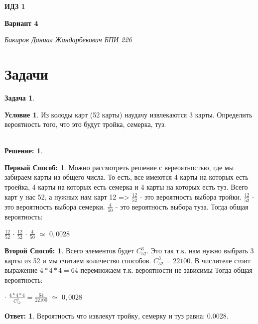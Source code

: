 \documentclass[amstex,11pt,a4paper]{article}
\theoremstyle{definition}
\newtheorem{ex}[problem]{Задача}
\newtheorem{disc}{Условие}
\newtheorem{resh}{Решение:}
\newtheorem{pl}{Первый Способ:}
\newtheorem{pk}{Второй Способ:}
\newtheorem{answer}{Ответ:}
\begin{document}

\centerline{\textbf{ИДЗ 1}}
\centerline{\textbf{Вариант 4}}
\begin{flushright}
\emph{Бакиров Даниал Жандарбекович БПИ 226}
\end{flushright}

\thispagestyle{empty}

\section{Задачи}


\begin{ex}
\begin{disc}
    Из колоды карт (52 карты) наудачу извлекаются 3 карты. Определить
вероятность того, что это будут тройка, семерка, туз.
\\
\\
\begin{resh}
    \begin{pl}
        Можно рассмотреть решение с вереоятностью, где мы забираем карты из общего числа. То есть, все имеются 4 карты на которых есть троейка, 4 карты на которых есть семерка и 4 карты на которых есть туз. Всего карт у нас 52, а нужных нам карт 12 => $\frac{12}{52} $ - это вероятность выбора тройки. $\frac{12}{52} $ - это вероятность выбора семерки. $\frac{4}{50} $ - это вероятность выбора туза. 
        Тогда общая вероятность: 
        \begin{center}
        $\frac{12}{52} $ $\cdot$ $\frac{12}{52}$ $\cdot$ $\frac{4}{50} $ $\simeq$ $0,0028$
        \end{center}
    \end{pl}
    \begin{pk}
        Всего элементов будет $C_{52}^3$. Это так т.к. нам нужно выбрать 3 карты из 52 и мы считаем количество способов. $C_{52}^3 = 22100$. В числителе стоит выражение $4 * 4 * 4 = 64$ перемножаем т.к. вероятности не зависимы
        Тогда общая вероятность: 
        \begin{center}
        $\cdot$ $\frac{4 * 4 * 4}{C_{52}^3} = \frac{64}{22100}$ $\simeq$ $0,0028$
        \end{center}
    \end{pk}
    \begin{answer}
        Вероятность что извлекут тройку, семерку и туз равна: 0.0028.
    \end{answer}
\end{resh}
\end{disc}


\end{ex}
\end{document}
